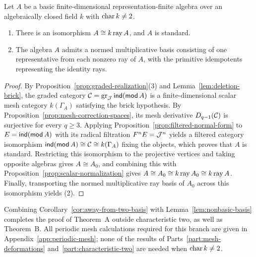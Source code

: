 \begin{corollary}
\label{cor:away-from-two-basis}
Let $A$ be a basic finite-dimensional representation-finite algebra over an
algebraically closed field $k$ with $\operatorname{char} k\ne2$.
\begin{enumerate}[label={\upshape(\arabic*)}]
\item There is an isomorphism $A\cong k\operatorname{ray} A$, and $A$ is standard.
\item The algebra $A$ admits a normed multiplicative basis consisting of one
representative from each nonzero ray of $A$, with the primitive idempotents
representing the identity rays.
\end{enumerate}
\end{corollary}
\begin{proof}
By Proposition~\ref{prop:graded-realization}(3) and
Lemma~\ref{lem:deletion-brick}, the graded category $\mathcal C=\operatorname{gr}_\mathcal J\operatorname{\mathsf{ind}}(\operatorname{\mathsf{mod}} A)$
is a finite-dimensional scalar mesh category $k(\Gamma_A)$ satisfying the
brick hypothesis. By Proposition~\ref{prop:mesh-correction-spaces}, its mesh
derivative $D_{q-1}(\mathcal C)$ is surjective for every $q\geq3$. Applying
Proposition~\ref{prop:filtered-normal-form} to $E=\operatorname{\mathsf{ind}}(\operatorname{\mathsf{mod}} A)$ with its
radical filtration $F^n E=\mathcal J^n$ yields a filtered category isomorphism
$\operatorname{\mathsf{ind}}(\operatorname{\mathsf{mod}} A)\cong\mathcal C\cong k(\Gamma_A)$ fixing the objects, which proves that
$A$ is standard. Restricting this isomorphism to the projective vertices and
taking opposite algebras gives $A\cong A_0$, and combining this with
Proposition~\ref{prop:scalar-normalization} gives
$A\cong A_0\cong k\operatorname{ray} A_0\cong k\operatorname{ray} A$. Finally, transporting the normed
multiplicative ray basis of $A_0$ across this isomorphism yields (2).
\end{proof}

Combining Corollary~\ref{cor:away-from-two-basis} with
Lemma~\ref{lem:nonbasic-basis} completes the proof of Theorem~A outside
characteristic two, as well as Theorem~B. All periodic mesh calculations
required for this branch are given in Appendix~\ref{app:periodic-mesh}; none
of the results of Parts~\ref{part:mesh-deformations}
and~\ref{part:characteristic-two} are needed when $\operatorname{char} k\ne2$.

